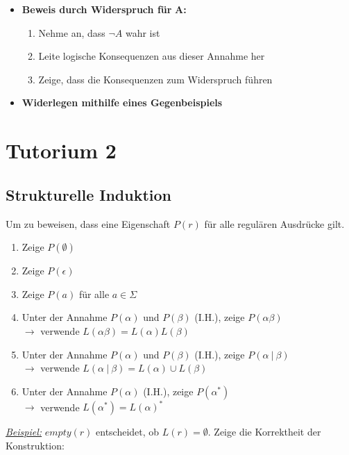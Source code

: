 \documentclass[ieeetran]{article}
\begin{document}
\begin{itemize}
\item \textbf{Beweis durch Widerspruch für }$\mathbf{A}$\textbf{:}
	\begin{enumerate}
		\item Nehme an, dass $\neg A$ wahr ist
		\item Leite logische Konsequenzen aus dieser Annahme her
		\item Zeige, dass die Konsequenzen zum Widerspruch führen
	\end{enumerate}
\item \textbf{Widerlegen mithilfe eines Gegenbeispiels}
\end{itemize}


\section{Tutorium 2} %
\label{sec:tutorium_2}

\subsection{Strukturelle Induktion} %
\label{sub:strukturelle_induktion}
Um zu beweisen, dass eine Eigenschaft $P(r)$ für alle regulären Ausdrücke gilt.
\begin{enumerate}
	\item Zeige $P(\emptyset)$
	\item Zeige $P(\epsilon)$
	\item Zeige $P(a)$ für alle $a \in \Sigma$
	\item Unter der Annahme $P(\alpha)$ und $P(\beta)$ (I.H.), zeige $P(\alpha \beta)$ \\$\rightarrow$ verwende $L(\alpha \beta) =L(\alpha)L(\beta)$
	\item Unter der Annahme $P(\alpha)$ und $P(\beta)$ (I.H.), zeige $P(\alpha \ | \ \beta)$ \\$\rightarrow$ verwende $L(\alpha \ | \ \beta) =L(\alpha) \cup L(\beta)$
	\item Unter der Annahme $P(\alpha)$ (I.H.), zeige $P(\alpha^*)$ \\$\rightarrow$ verwende $L(\alpha^*) = L(\alpha)^*$
	
\end{enumerate}


\textit{\underline{Beispiel:}} $empty(r)$ entscheidet, ob $L(r) = \emptyset$. Zeige die Korrektheit der Konstruktion:
\end{document}

